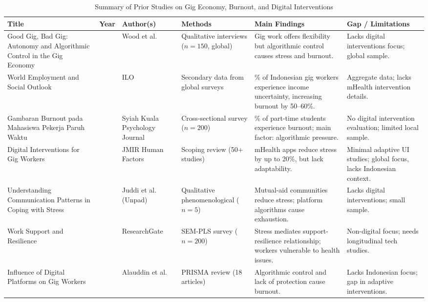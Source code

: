 \begin{table}[p]
\centering
\footnotesize
\setlength{\tabcolsep}{4pt}
\renewcommand{\arraystretch}{1.15}
\caption{Summary of Prior Studies on Gig Economy, Burnout, and Digital Interventions}
\label{tab:literature-review}
\begin{tabular}{>{\raggedright\arraybackslash}p{}
			  >{\centering\arraybackslash}p{}
			  >{\raggedright\arraybackslash}p{}
			  >{\raggedright\arraybackslash}p{}
			  >{\raggedright\arraybackslash}p{}
			  >{\raggedright\arraybackslash}p{}}
\hline
\textbf{Title} & \textbf{Year} & \textbf{Author(s)} & \textbf{Methods} & \textbf{Main Findings} & \textbf{Gap / Limitations} \\
\hline
Good Gig, Bad Gig: Autonomy and Algorithmic Control in the Gig Economy & 2019 & Wood et al. & Qualitative interviews ($n=150$, global) & Gig work offers flexibility but algorithmic control causes stress and burnout. & Lacks digital interventions focus; global sample. \\
\hline
World Employment and Social Outlook & 2025 & ILO & Secondary data from global surveys & 41\% of Indonesian gig workers experience income uncertainty, increasing burnout by 50--60\%. & Aggregate data; lacks mHealth intervention details. \\
\hline
Gambaran Burnout pada Mahasiswa Pekerja Paruh Waktu & 2024 & Syiah Kuala Psychology Journal & Cross-sectional survey ($n=200$) & 91\% of part-time students experience burnout; main factor: algorithmic pressure. & No digital intervention evaluation; limited local sample. \\
\hline
Digital Interventions for Gig Workers & 2025 & JMIR Human Factors & Scoping review (50+ studies) & mHealth apps reduce stress by up to 20\%, but lack adaptability. & Minimal adaptive UI studies; global focus, lacks Indonesian context. \\
\hline
Understanding Communication Patterns in Coping with Stress & 2025 & Juddi et al. (Unpad) & Qualitative phenomenological ($n=5$) & Mutual-aid communities reduce stress; platform algorithms cause exhaustion. & Lacks digital interventions; small sample. \\
\hline
Work Support and Resilience & 2025 & ResearchGate & SEM-PLS survey ($n=200$) & Stress mediates support-resilience relationship; workers vulnerable to health issues. & Non-digital focus; needs longitudinal tech studies. \\
\hline
Influence of Digital Platforms on Gig Workers & 2025 & Alauddin et al. & PRISMA review (18 articles) & Algorithmic control and lack of protection cause burnout. & Lacks Indonesian focus; gap in adaptive interventions. \\

\end{tabular}
\end{table}
